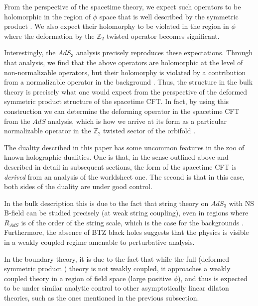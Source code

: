 \documentclass[12pt]{article}
\newcommand{\bZ}{{\mathbb Z}}
\numberwithin{equation}{section}
\begin{document}
From the perspective of the spacetime theory, we expect such operators to be holomorphic in the region of $\phi$ space that is well described by the symmetric product \ourcft. We also expect their holomorphy to be violated in the region in $\phi$ where the deformation by the $\bZ_2$ twisted operator becomes significant. 

Interestingly, the $AdS_3$ analysis precisely reproduces these expectations.  Through that analysis, we find that the above operators are holomorphic at the level of non-normalizable operators, but their holomorphy is violated by a contribution from a normalizable operator in the background \ourads. Thus, the structure in the bulk theory is precisely what one would expect from the perspective of the deformed symmetric product structure of the spacetime CFT. In fact, by using this construction we can determine the deforming operator in the spacetime CFT from the $AdS$ analysis, which is how we arrive at its form as a particular normalizable operator in the $\bZ_2$ twisted sector of the orbifold \ourcft. 

The duality described in this paper has some uncommon features in the zoo of known holographic dualities. One is that, in the sense outlined above and described in detail in subsequent sections, the form of the spacetime CFT is {\it derived} from an analysis of the worldsheet one. The second is that in this case, both sides of the duality are under good control. 

In the bulk description this is due to the fact that string theory on $AdS_3$ with NS B-field can be studied precisely (at weak string coupling), even in regions where $R_{AdS}$ is of the order of the string scale, which is the case for the backgrounds \ourads. 
Furthermore, the absence of BTZ black holes suggests that the physics is visible in a weakly coupled regime amenable to perturbative analysis. 

In the boundary theory, it is due to the fact that while the full (deformed symmetric product \ourcft) theory is not weakly coupled, it approaches a weakly coupled theory in a region of field space (large positive $\phi$), and thus is expected to be under similar analytic control to other asymptotically linear dilaton theories, such as the ones mentioned in the previous subsection.  




\end{document}
